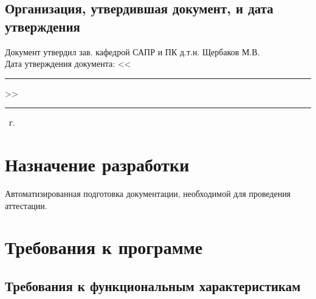 \documentclass[14pt]{extarticle}        %
\begin{document}
\subsection{Организация, утвердившая документ, и дата утверждения}
Документ утвердил зав. кафедрой САПР и ПК д.т.н. Щербаков М.В.\\
Дата утверждения документа: <<\rule{7mm}{0.4pt}>> \rule{35mm}{0.4pt} \number\year\ г.

\newpage

\section{Назначение разработки}
Автоматизированная подготовка документации, необходимой для проведения аттестации.

\newpage

\section{Требования к программе}
\subsection{Требования к функциональным характеристикам}
\end{document}
